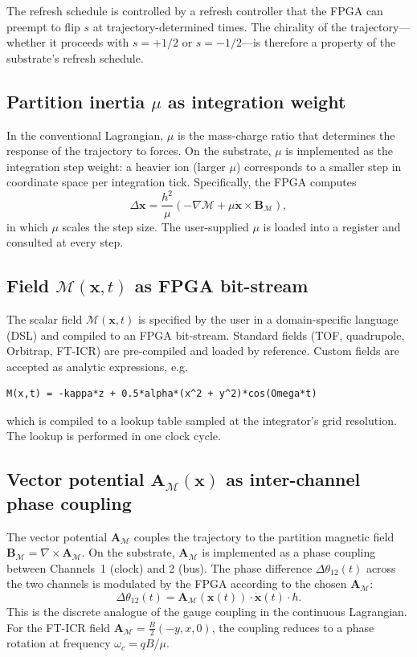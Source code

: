 \documentclass[twocolumn,11pt,a4paper]{article}
\theoremstyle{definition}
\theoremstyle{remark}
\newcommand{\Depth}{\mathcal{M}}
\newcommand{\Apartition}{\mathbf{A}_{\mathcal{M}}}
\newcommand{\Bpartition}{\mathbf{B}_{\mathcal{M}}}
\newcommand{\partinert}{\mu}
\begin{document}
The refresh schedule is controlled by a refresh controller that the FPGA can preempt to flip $s$ at trajectory-determined times. The chirality of the trajectory---whether it proceeds with $s = +1/2$ or $s = -1/2$---is therefore a property of the substrate's refresh schedule.

\subsection{Partition inertia $\partinert$ as integration weight}

In the conventional Lagrangian, $\partinert$ is the mass-charge ratio that determines the response of the trajectory to forces. On the substrate, $\partinert$ is implemented as the integration step weight: a heavier ion (larger $\partinert$) corresponds to a smaller step in coordinate space per integration tick. Specifically, the FPGA computes
\begin{equation}
    \Delta \mathbf{x} = \frac{h^2}{\partinert}(-\nabla \Depth + \partinert \dot{\mathbf{x}} \times \Bpartition),
\end{equation}
in which $\partinert$ scales the step size. The user-supplied $\partinert$ is loaded into a register and consulted at every step.

\subsection{Field $\Depth(\mathbf{x},t)$ as FPGA bit-stream}

The scalar field $\Depth(\mathbf{x},t)$ is specified by the user in a domain-specific language (DSL) and compiled to an FPGA bit-stream. Standard fields (TOF, quadrupole, Orbitrap, FT-ICR) are pre-compiled and loaded by reference. Custom fields are accepted as analytic expressions, e.g.
\begin{verbatim}
M(x,t) = -kappa*z + 0.5*alpha*(x^2 + y^2)*cos(Omega*t)
\end{verbatim}
which is compiled to a lookup table sampled at the integrator's grid resolution. The lookup is performed in one clock cycle.

\subsection{Vector potential $\Apartition(\mathbf{x})$ as inter-channel phase coupling}

The vector potential $\Apartition$ couples the trajectory to the partition magnetic field $\Bpartition = \nabla \times \Apartition$. On the substrate, $\Apartition$ is implemented as a phase coupling between Channels~1 (clock) and 2 (bus). The phase difference $\Delta\theta_{12}(t)$ across the two channels is modulated by the FPGA according to the chosen $\Apartition$:
\begin{equation}
    \Delta\theta_{12}(t) = \Apartition(\mathbf{x}(t)) \cdot \dot{\mathbf{x}}(t) \cdot h.
\end{equation}
This is the discrete analogue of the gauge coupling in the continuous Lagrangian. For the FT-ICR field $\Apartition = \tfrac{B}{2}(-y, x, 0)$, the coupling reduces to a phase rotation at frequency $\omega_c = qB/\partinert$.
\end{document}
